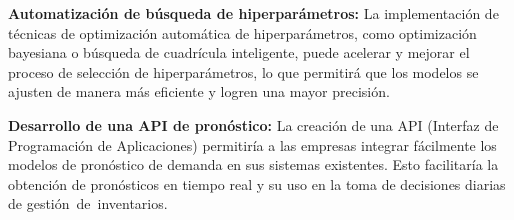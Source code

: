 \textbf{Automatización de búsqueda de hiperparámetros:} La implementación de técnicas de optimización automática de hiperparámetros, como optimización bayesiana o búsqueda de cuadrícula inteligente, puede acelerar y mejorar el proceso de selección de hiperparámetros, lo que permitirá que los modelos se ajusten de manera más eficiente y logren una mayor precisión.

\textbf{Desarrollo de una API de pronóstico:} La creación de una API (Interfaz de Programación de Aplicaciones) permitiría a las empresas integrar fácilmente los modelos de pronóstico de demanda en sus sistemas existentes. Esto facilitaría la obtención de pronósticos en tiempo real y su uso en la toma de decisiones diarias de gestión de inventarios.
